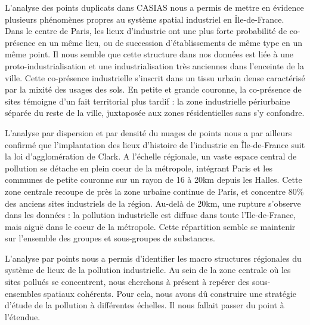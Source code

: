 \documentclass[a4paper,twoside,12pt]{book}
\begin{document}
L'analyse des points duplicats dans CASIAS nous a permis de mettre en évidence plusieurs phénomènes propres au système spatial industriel en Île-de-France. Dans le centre de Paris, les lieux d'industrie ont une plus forte probabilité de co-présence en un même lieu, ou de succession d'établissements de même type en un même point. Il nous semble que cette structure dans nos données est liée à une proto-industrialisation et une industrialisation très anciennes dans l'enceinte de la ville. Cette co-présence industrielle s'inscrit dans un tissu urbain dense caractérisé par la mixité des usages des sols. En petite et grande couronne, la co-présence de sites témoigne d'un fait territorial plus tardif : la zone industrielle périurbaine séparée du reste de la ville, juxtaposée aux zones résidentielles sans s'y confondre. 

L'analyse par dispersion et par densité du nuages de points nous a par ailleurs confirmé que l'implantation des lieux d'histoire de l'industrie en Île-de-France suit la loi d'agglomération de Clark. A l'échelle régionale, un vaste espace central de pollution se détache en plein coeur de la métropole, intégrant Paris et les communes de petite couronne sur un rayon de 16 à 20km depuis les Halles. Cette zone centrale recoupe de près la zone urbaine continue de Paris, et concentre 80\% des anciens sites industriels de la région. Au-delà de 20km, une rupture s'observe dans les données : la pollution industrielle est diffuse dans toute l'Ile-de-France, mais aiguë dans le coeur de la métropole. Cette répartition semble se maintenir sur l'ensemble des groupes et sous-groupes de substances. 

L'analyse par points nous a permis d'identifier les macro structures régionales du système de lieux de la pollution industrielle. Au sein de la zone centrale où les sites pollués se concentrent, nous cherchons à présent à repérer des sous-ensembles spatiaux cohérents. Pour cela, nous avons dû construire une stratégie d'étude de la pollution à différentes échelles. Il nous fallait passer du point à l'étendue. 


\end{document}
